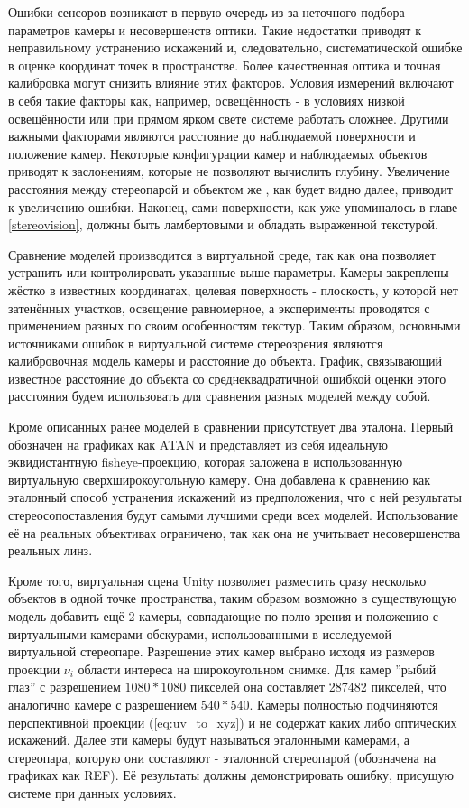 Ошибки сенсоров возникают в первую очередь из-за неточного подбора параметров камеры и несовершенств оптики. Такие недостатки приводят
к неправильному устранению искажений и, следовательно, систематической ошибке в оценке координат точек в пространстве. Более 
качественная оптика и точная калибровка могут снизить влияние этих факторов.
Условия измерений включают в себя такие факторы как, например, освещённость - в условиях низкой освещённости или при прямом ярком свете системе работать сложнее.
Другими важными факторами являются расстояние до наблюдаемой поверхности и положение камер. Некоторые конфигурации камер и наблюдаемых объектов приводят к
заслонениям, которые не позволяют вычислить глубину. Увеличение расстояния между стереопарой и объектом же , как будет видно далее, приводит к увеличению ошибки.  
Наконец, сами поверхности, как уже упоминалось в главе \ref{stereovision}, должны быть ламбертовыми и обладать выраженной текстурой. 

Сравнение моделей производится в виртуальной среде, так как она позволяет устранить или контролировать указанные выше параметры. Камеры закреплены жёстко в 
известных координатах, целевая поверхность - плоскость, у которой нет затенённых участков, освещение равномерное, а эксперименты проводятся с 
применением разных по своим особенностям текстур. Таким образом, основными источниками ошибок в виртуальной системе стереозрения являются калибровочная модель 
камеры и расстояние до объекта. График, связывающий известное расстояние до объекта со среднеквадратичной ошибкой оценки этого расстояния будем использовать
для сравнения разных моделей между собой. 

Кроме описанных ранее моделей в сравнении  присутствует два эталона. Первый обозначен на графиках как ATAN и представляет из себя идеальную 
эквидистантную fisheye-проекцию, которая заложена в использованную виртуальную сверхширокоугольную камеру. Она добавлена к сравнению как 
эталонный способ устранения искажений из предположения, что с ней результаты стереосопоставления будут самыми лучшими среди всех моделей. 
Использование её на реальных объективах ограничено, так как она не учитывает несовершенства реальных линз. 

Кроме того, виртуальная сцена Unity позволяет разместить сразу несколько объектов в одной точке пространства, таким образом возможно
в существующую модель добавить ещё 2 камеры, совпадающие по полю зрения и положению с виртуальными камерами-обскурами, использованными 
в исследуемой виртуальной стереопаре. Разрешение этих камер выбрано исходя из размеров проекции $\nu_i$ области интереса на широкоугольном
снимке. Для камер ''рыбий глаз'' с разрешением $1080*1080$ пикселей она составляет 287482 пикселей, что аналогично камере 
с разрешением $540*540$. Камеры полностью подчиняются перспективной проекции (\ref{eq:uv_to_xyz}) и не содержат каких либо оптических искажений.
 Далее эти камеры будут называться эталонными камерами, а стереопара, которую они составляют - эталонной стереопарой (обозначена на графиках как REF).
Её результаты должны демонстрировать ошибку, присущую системе при данных условиях. %

